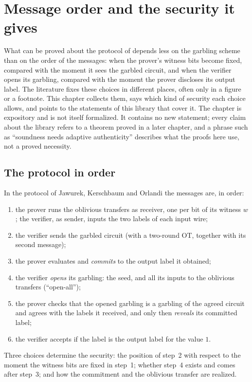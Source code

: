 \chapter{Message order and the security it gives}
\label{chap:variants}

What can be proved about the protocol of \cite{JKO13} depends less on the garbling scheme than on
the order of the messages: when the prover's witness bits become fixed, compared with the moment
it sees the garbled circuit, and when the verifier opens its garbling, compared with the moment
the prover discloses its output label. The literature fixes these choices in different places, often
only in a figure or a footnote. This chapter collects them, says which kind of security each
choice allows, and points to the statements of this library that cover it. The chapter is
expository and is not itself formalized. It contains no new statement; every claim about the
library refers to a theorem proved in a later chapter, and a phrase such as ``soundness needs
adaptive authenticity'' describes what the proofs here use, not a proved necessity.

\section{The protocol in order}

In the protocol of Jawurek, Kerschbaum and Orlandi \cite[Sect.~1.1, Fig.~1]{JKO13} the messages
are, in order:
\begin{enumerate}
  \item the prover runs the oblivious transfers as receiver, one per bit of its witness $w$; the
  verifier, as sender, inputs the two labels of each input wire;
  \item the verifier sends the garbled circuit (with a two-round OT, together with its second
  message);
  \item the prover evaluates and \emph{commits} to the output label it obtained;
  \item the verifier \emph{opens} its garbling: the seed, and all its inputs to the oblivious
  transfers (``open-all'');
  \item the prover checks that the opened garbling is a garbling of the agreed circuit and agrees
  with the labels it received, and only then \emph{reveals} its committed label;
  \item the verifier accepts if the label is the output label for the value $1$.
\end{enumerate}
Three choices determine the security: the position of step~2 with respect to the moment the
witness bits are fixed in step~1; whether step~4 exists and comes after step~3; and how the
commitment and the oblivious transfer are realized.

